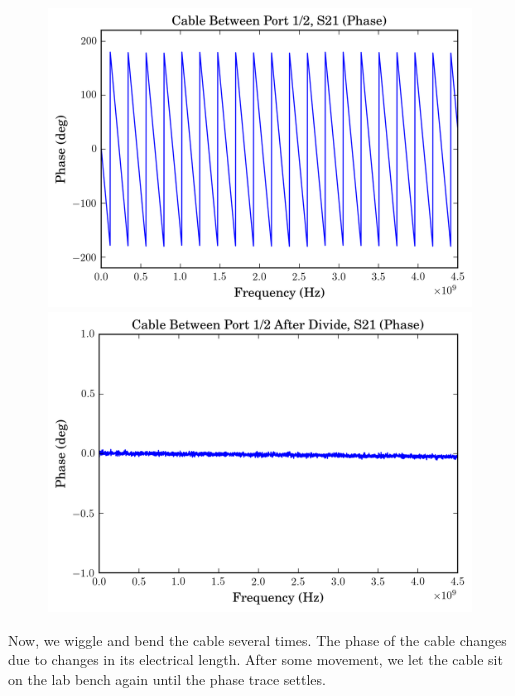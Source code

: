 \documentclass[11pt]{article}
\begin{document}
\begin{figure}[H]
	\includegraphics[width=\linewidth]{images/cable_phase_s21_phase.png}
	\endminipage\hfill
	\includegraphics[width=\linewidth]{images/cable_phase_s21_after_data_divide.png}
	\endminipage
\end{figure}

Now, we wiggle and bend the cable several times. The phase of the cable changes due to changes in its electrical length. After some movement, we let the cable sit on the lab bench again until the phase trace settles.
\end{document}
